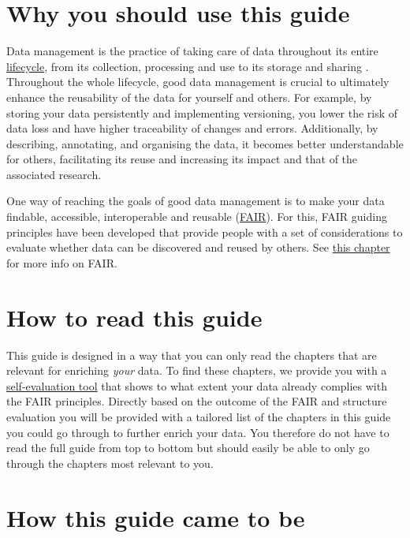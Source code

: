 \documentclass[
  oneside]{book}
\begin{document}
\section*{Why you should use this guide}\label{why-you-should-use-this-guide}

Data management is the practice of taking care of data throughout its entire \hyperref[datalifecycle]{lifecycle}, from its collection, processing and use to its storage and sharing \autocite{Willoughby_2022}. Throughout the whole lifecycle, good data management is crucial to ultimately enhance the reusability of the data for yourself and others. For example, by storing your data persistently and implementing versioning, you lower the risk of data loss and have higher traceability of changes and errors. Additionally, by describing, annotating, and organising the data, it becomes better understandable for others, facilitating its reuse and increasing its impact and that of the associated research.

One way of reaching the goals of good data management is to make your data findable, accessible, interoperable and reusable (\hyperref[FAIR]{FAIR}). For this, FAIR guiding principles have been developed \autocite{Wilkinson_2016} that provide people with a set of considerations to evaluate whether data can be discovered and reused by others. See \hyperref[what-is-fair]{this chapter} for more info on FAIR.

\section*{How to read this guide}\label{how-to-read-this-guide}

This guide is designed in a way that you can only read the chapters that are relevant for enriching \emph{your} data. To find these chapters, we provide you with a \hyperref[evaluation]{self-evaluation tool} that shows to what extent your data already complies with the FAIR principles. Directly based on the outcome of the FAIR and structure evaluation you will be provided with a tailored list of the chapters in this guide you could go through to further enrich your data. You therefore do not have to read the full guide from top to bottom but should easily be able to only go through the chapters most relevant to you.

\section*{How this guide came to be}\label{how-this-guide-came-to-be}
\end{document}
